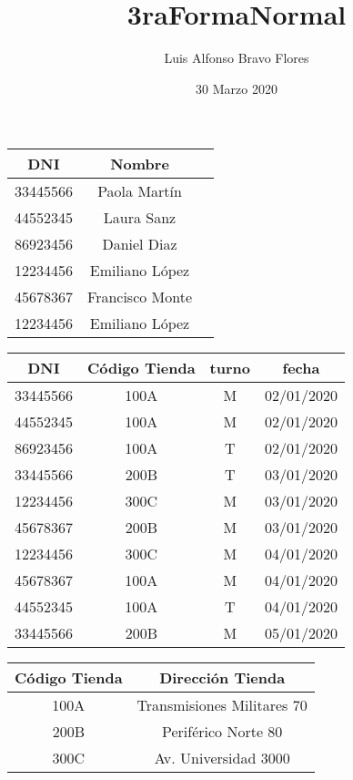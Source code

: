 \documentclass{article}
\title{3raFormaNormal}
\author{Luis Alfonso Bravo Flores }
\date{30 Marzo 2020}
\begin{document}
\maketitle

\centering

\begin{tabular}{|c|c|c|}

\hline
DNI & Nombre \\
\hline
33445566 & Paola Martín \\
\hline
44552345 & Laura Sanz \\
\hline
86923456 & Daniel Diaz \\
\hline
 12234456 & Emiliano López \\
 \hline
 45678367 & Francisco Monte \\
 \hline
 12234456 & Emiliano López \\
 
\hline
\end{tabular}

\hspace{2em} 

\centering

\begin{tabular}{|c|c|c|c|}
\hline
DNI & Código Tienda  & turno & fecha \\
\hline
33445566 & 100A  & M & 02/01/2020 \\
\hline
44552345 & 100A & M & 02/01/2020 \\
\hline
86923456 & 100A  & T & 02/01/2020 \\
\hline
 33445566 & 200B  & T & 03/01/2020 \\
 \hline
 12234456 & 300C  & M & 03/01/2020 \\
 \hline
 45678367 & 200B  & M & 03/01/2020 \\
 \hline
 12234456 & 300C & M & 04/01/2020 \\
 \hline
 45678367 & 100A  & M & 04/01/2020 \\
 \hline
 44552345 & 100A  & T & 04/01/2020 \\
 \hline
 33445566 & 200B & M & 05/01/2020 \\
 
\hline
\end{tabular}



\begin{tabular}{|c|c|}

\hline
Código Tienda & Dirección Tienda  \\
\hline
100A & Transmisiones Militares 70 \\
\hline
 200B & Periférico Norte 80 \\
 \hline
 300C & Av. Universidad 3000 \\
\hline
\end{tabular}
\end{document}
